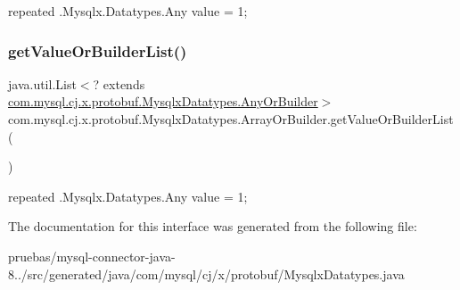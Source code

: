 {\ttfamily repeated .Mysqlx.\+Datatypes.\+Any value = 1;} \mbox{\label{interfacecom_1_1mysql_1_1cj_1_1x_1_1protobuf_1_1_mysqlx_datatypes_1_1_array_or_builder_a1a2e144dc119a975787cbf8d10b5d8a2}} 
\subsubsection{\texorpdfstring{get\+Value\+Or\+Builder\+List()}{getValueOrBuilderList()}}
{\footnotesize\ttfamily java.\+util.\+List$<$? extends \mbox{\hyperlink{interfacecom_1_1mysql_1_1cj_1_1x_1_1protobuf_1_1_mysqlx_datatypes_1_1_any_or_builder}{com.\+mysql.\+cj.\+x.\+protobuf.\+Mysqlx\+Datatypes.\+Any\+Or\+Builder}}$>$ com.\+mysql.\+cj.\+x.\+protobuf.\+Mysqlx\+Datatypes.\+Array\+Or\+Builder.\+get\+Value\+Or\+Builder\+List (\begin{DoxyParamCaption}{ }\end{DoxyParamCaption})}

{\ttfamily repeated .Mysqlx.\+Datatypes.\+Any value = 1;} 

The documentation for this interface was generated from the following file\+:\begin{DoxyCompactItemize}
\item 
pruebas/mysql-\/connector-\/java-\/8../src/generated/java/com/mysql/cj/x/protobuf/Mysqlx\+Datatypes.\+java\end{DoxyCompactItemize}
